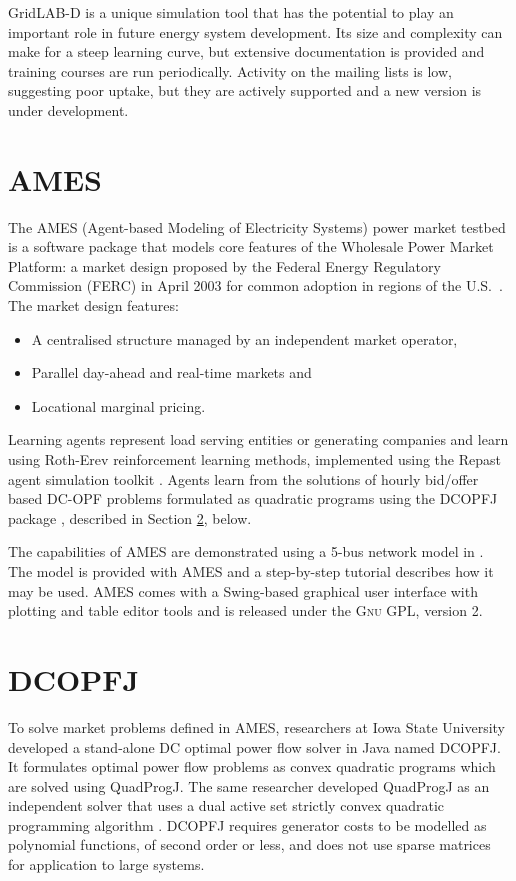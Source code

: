 GridLAB-D is a unique simulation tool that has the potential to play an
important role in future energy system development.  Its size and complexity
can make for a steep learning curve, but extensive documentation is provided
and training courses are run periodically.  Activity on the mailing lists is low,
suggesting poor uptake, but they are actively supported and a new version is
under development.

\section{AMES}
\label{sec:ames}
The AMES (Agent-based Modeling of Electricity Systems) power market testbed is
a software package that models core features of the Wholesale Power Market
Platform: a market design proposed by the Federal Energy Regulatory
Commission (FERC) in April 2003 for common adoption in regions of the
U.S.~\cite{tesfatsi:wpmp}. The market design features:
\begin{itemize}
  \item A centralised structure managed by an independent market operator,
  \item Parallel day-ahead and real-time markets and
  \item Locational marginal pricing.
\end{itemize}
Learning agents represent load serving entities or generating companies and
learn using Roth-Erev reinforcement learning methods,
implemented using the Repast agent simulation toolkit \cite{gieseler:thesis}.
Agents learn from the solutions of hourly bid/offer based
DC-OPF problems formulated as quadratic programs using the DCOPFJ package
\cite{tesfatsi:dcopf}, described in Section \ref{sec:dcopfj}, below.

The capabilities of AMES are demonstrated using a 5-bus network model in
.  The model is provided with AMES and a step-by-step
tutorial describes how it may be used.  AMES comes with a
Swing-based graphical user interface with plotting and table editor tools and
is released under the \textsc{Gnu} GPL, version 2.

\section{DCOPFJ}
\label{sec:dcopfj}
To solve market problems defined in AMES, researchers at Iowa State University
developed a stand-alone DC optimal power flow solver in Java named DCOPFJ.
It formulates optimal power flow problems as convex quadratic programs
which are solved using QuadProgJ.  The same researcher developed QuadProgJ as
an independent solver that uses a dual active set strictly convex quadratic
programming algorithm \cite{goldfarb:scqp}.  DCOPFJ requires
generator costs to be modelled as polynomial functions, of second order or
less, and does not use sparse matrices for application to large systems.


